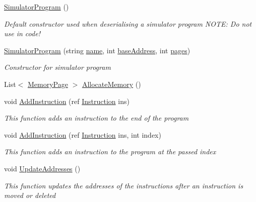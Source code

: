\begin{DoxyCompactItemize}
\item 
\hyperlink{class_c_p_u___o_s___simulator_1_1_c_p_u_1_1_simulator_program_a92873858cd0a0d7e506f5718788a9e5e}{Simulator\+Program} ()
\begin{DoxyCompactList}\small\item\em Default constructor used when deserialising a simulator program N\+O\+T\+E\+: Do not use in code! \end{DoxyCompactList}\item 
\hyperlink{class_c_p_u___o_s___simulator_1_1_c_p_u_1_1_simulator_program_aa0d38ce5b657952b2dddc6bdfc009421}{Simulator\+Program} (string \hyperlink{class_c_p_u___o_s___simulator_1_1_c_p_u_1_1_simulator_program_ad4797b5d81ceb01cd4207a97b7af36c5}{name}, int \hyperlink{class_c_p_u___o_s___simulator_1_1_c_p_u_1_1_simulator_program_a7cca2ee3950e37d25f4f68d76d1241c4}{base\+Address}, int \hyperlink{class_c_p_u___o_s___simulator_1_1_c_p_u_1_1_simulator_program_ad86f4c2caa37cf36b8ab276ebe2a39bb}{pages})
\begin{DoxyCompactList}\small\item\em Constructor for simulator program \end{DoxyCompactList}\item 
List$<$ \hyperlink{class_c_p_u___o_s___simulator_1_1_memory_1_1_memory_page}{Memory\+Page} $>$ \hyperlink{class_c_p_u___o_s___simulator_1_1_c_p_u_1_1_simulator_program_a8f56bf19c4defa3f61c554e635f4904a}{Allocate\+Memory} ()
\item 
void \hyperlink{class_c_p_u___o_s___simulator_1_1_c_p_u_1_1_simulator_program_a6b6df3400e406b1dc6de3787f1a8fc61}{Add\+Instruction} (ref \hyperlink{class_c_p_u___o_s___simulator_1_1_c_p_u_1_1_instruction}{Instruction} ins)
\begin{DoxyCompactList}\small\item\em This function adds an instruction to the end of the program \end{DoxyCompactList}\item 
void \hyperlink{class_c_p_u___o_s___simulator_1_1_c_p_u_1_1_simulator_program_a1142bf081f4173d0276504db3d232968}{Add\+Instruction} (ref \hyperlink{class_c_p_u___o_s___simulator_1_1_c_p_u_1_1_instruction}{Instruction} ins, int index)
\begin{DoxyCompactList}\small\item\em This function adds an instruction to the program at the passed index \end{DoxyCompactList}\item 
void \hyperlink{class_c_p_u___o_s___simulator_1_1_c_p_u_1_1_simulator_program_a4f7e933d4f3ca318d68471d465c6b31c}{Update\+Addresses} ()
\begin{DoxyCompactList}\small\item\em This function updates the addresses of the instructions after an instruction is moved or deleted \end{DoxyCompactList}\end{DoxyCompactItemize}
